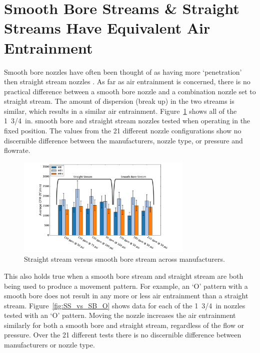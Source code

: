 \documentclass[12pt,oneside]{book}
\begin{document}
\section{Smooth Bore Streams \& Straight Streams Have Equivalent Air Entrainment} 
Smooth bore nozzles have often been thought of as having more `penetration' then straight stream nozzles \cite{Klaene:1}. As far as air entrainment is concerned, there is no practical difference between a smooth bore nozzle and a combination nozzle set to straight stream. The amount of dispersion (break up) in the two streams is similar, which results in a similar air entrainment. Figure~\ref{fig:SS_vs_SB} shows all of the 1~3/4~in. smooth bore and straight stream nozzles tested when operating in the fixed position. The values from the 21 different nozzle configurations show no discernible difference between the manufacturers, nozzle type, or pressure and flowrate.

\begin{figure}[H]
\centering
\includegraphics[width=0.75\textwidth]{Figures/Air_Entrainment/SB_SS_All_Manufacture.pdf}
\caption[Straight Stream vs. Smooth Bore Stream Across Manufacturers]{Straight stream versus smooth bore stream across manufacturers.}
\label{fig:SS_vs_SB}
\end{figure}

This also holds true when a smooth bore stream and straight stream are both being used to produce a movement pattern. For example, an `O' pattern with a smooth bore does not result in any more or less air entrainment than a straight stream. Figure~\ref{fig:SS_vs_SB_O} shows data for each of the 1~3/4~in nozzles tested with an `O' pattern. Moving the nozzle increases the air entrainment similarly for both a smooth bore and straight stream, regardless of the flow or pressure. Over the 21 different tests there is no discernible difference between manufacturers or nozzle type. 
\end{document}
